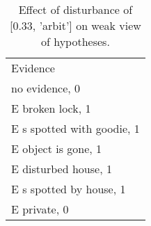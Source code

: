 \begin{table}\begin{tabular}{l}\toprule\multirow{2}{*}{Evidence} \\\\\midrule
no evidence, 0 & \\E broken lock, 1 & \\E s spotted with goodie, 1 & \\E object is gone, 1 & \\E disturbed house, 1 & \\E s spotted by house, 1 & \\E private, 0 & \\\bottomrule\end{tabular}\caption{Effect of disturbance of [0.33, 'arbit'] on weak view of hypotheses.}\end{table}